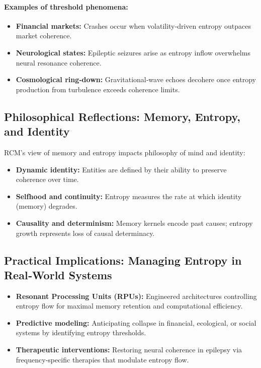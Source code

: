 \paragraph{Examples of threshold phenomena:}
\begin{itemize}
  \item \textbf{Financial markets:}  
    Crashes occur when volatility‐driven entropy outpaces market coherence.
  \item \textbf{Neurological states:}  
    Epileptic seizures arise as entropy inflow overwhelms neural resonance coherence.
  \item \textbf{Cosmological ring‐down:}  
    Gravitational‐wave echoes decohere once entropy production from turbulence exceeds coherence limits.
\end{itemize}

\subsection{Philosophical Reflections: Memory, Entropy, and Identity}

RCM’s view of memory and entropy impacts philosophy of mind and identity:

\begin{itemize}
  \item \textbf{Dynamic identity:}  
    Entities are defined by their ability to preserve coherence over time.
  \item \textbf{Selfhood and continuity:}  
    Entropy measures the rate at which identity (memory) degrades.
  \item \textbf{Causality and determinism:}  
    Memory kernels encode past causes; entropy growth represents loss of causal determinacy.
\end{itemize}

\subsection{Practical Implications: Managing Entropy in Real‐World Systems}

\begin{itemize}
  \item \textbf{Resonant Processing Units (RPUs):}  
    Engineered architectures controlling entropy flow for maximal memory retention and computational efficiency.
  \item \textbf{Predictive modeling:}  
    Anticipating collapse in financial, ecological, or social systems by identifying entropy thresholds.
  \item \textbf{Therapeutic interventions:}  
    Restoring neural coherence in epilepsy via frequency‐specific therapies that modulate entropy flow.
\end{itemize}


